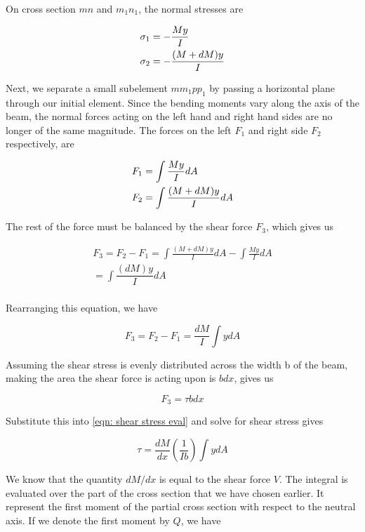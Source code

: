 \documentclass[
10pt,
a4paper,
openany,
svgnames,
]{book}
\begin{document}
On cross section $mn$ and $m_1n_1$, the normal stresses are

\[\begin{gathered}
  \sigma _1 =  - \frac{My}{I} \hfill \\
  \sigma _2 =  - \frac{(M + dM)y}{I} \hfill \\ 
\end{gathered} \]

Next, we separate a small subelement $mm_1pp_1$ by passing a horizontal plane through our initial element. Since the bending moments vary along the axis of the beam, the normal forces acting on the left hand and right hand sides are no longer of the same magnitude. The forces on the left $F_1$ and right side $F_2$ respectively, are

\begin{gather*}
    F_1 = \int \frac{My}{I}dA \hfill \\
    F_2 = \int \frac{(M + dM)y}{I}dA \hfill
\end{gather*}

The rest of the force must be balanced by the shear force $F_3$, which gives us

\[\begin{gathered}
  F_3 = F_2 - F_1 = \int \frac{(M + dM)y}{I}dA  - \int \frac{My}{I}dA  \\ 
   = \int \dfrac{(dM)y}{I}dA \\ 
 \end{gathered} \]

Rearranging this equation, we have

\begin{equation} \label{eqn: shear stress eval}
  F_3 = F_2 - F_1 = \frac{dM}{I}\int y dA
\end{equation}

Assuming the shear stress is evenly distributed across the width b of the beam, making the area the shear force is acting upon is $bdx$, gives us

\[F_3 = \tau bdx\]

Substitute this into \cref{eqn: shear stress eval} and solve for shear stress gives

\[\tau  = \frac{dM}{dx}\left( \frac{1}{Ib} \right) \int ydA \]

We know that the quantity $dM/dx$ is equal to the shear force $V$. The integral is evaluated over the part of the cross section that we have chosen earlier. It represent the first moment of the partial cross section with respect to the neutral axis. If we denote the first moment by $Q$, we have
\end{document}
